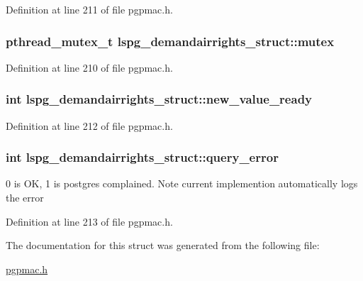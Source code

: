 Definition at line 211 of file pgpmac.\-h.

\hypertarget{structlspg__demandairrights__struct_a874970af767d4bb329f9764075b30096}{
\subsubsection[{mutex}]{\setlength{\rightskip}{0pt plus 5cm}pthread\-\_\-mutex\-\_\-t lspg\-\_\-demandairrights\-\_\-struct\-::mutex}}\label{structlspg__demandairrights__struct_a874970af767d4bb329f9764075b30096}


Definition at line 210 of file pgpmac.\-h.

\hypertarget{structlspg__demandairrights__struct_ad686c9a04d0c7e10b236c234eaf03ce7}{
\subsubsection[{new\-\_\-value\-\_\-ready}]{\setlength{\rightskip}{0pt plus 5cm}int lspg\-\_\-demandairrights\-\_\-struct\-::new\-\_\-value\-\_\-ready}}\label{structlspg__demandairrights__struct_ad686c9a04d0c7e10b236c234eaf03ce7}


Definition at line 212 of file pgpmac.\-h.

\hypertarget{structlspg__demandairrights__struct_ae3d1f2e51c623ecefefd87728905475d}{
\subsubsection[{query\-\_\-error}]{\setlength{\rightskip}{0pt plus 5cm}int lspg\-\_\-demandairrights\-\_\-struct\-::query\-\_\-error}}\label{structlspg__demandairrights__struct_ae3d1f2e51c623ecefefd87728905475d}


0 is O\-K, 1 is postgres complained. Note current implemention automatically logs the error 



Definition at line 213 of file pgpmac.\-h.



The documentation for this struct was generated from the following file\-:\begin{DoxyCompactItemize}
\item 
\hyperlink{pgpmac_8h}{pgpmac.\-h}\end{DoxyCompactItemize}
